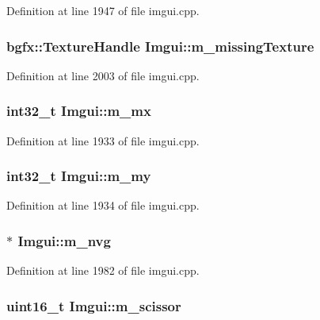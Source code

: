 Definition at line 1947 of file imgui.\+cpp.

\hypertarget{struct_imgui_afbc6e41c677110223b6319da003596e5}{
\subsubsection[{m\+\_\+missing\+Texture}]{\setlength{\rightskip}{0pt plus 5cm}bgfx\+::\+Texture\+Handle Imgui\+::m\+\_\+missing\+Texture}}\label{struct_imgui_afbc6e41c677110223b6319da003596e5}


Definition at line 2003 of file imgui.\+cpp.

\hypertarget{struct_imgui_a28eeab8c2fdd36902be42935ca1b068f}{
\subsubsection[{m\+\_\+mx}]{\setlength{\rightskip}{0pt plus 5cm}int32\+\_\+t Imgui\+::m\+\_\+mx}}\label{struct_imgui_a28eeab8c2fdd36902be42935ca1b068f}


Definition at line 1933 of file imgui.\+cpp.

\hypertarget{struct_imgui_a54acd29561c96474b53bd8c3aa26d1c8}{
\subsubsection[{m\+\_\+my}]{\setlength{\rightskip}{0pt plus 5cm}int32\+\_\+t Imgui\+::m\+\_\+my}}\label{struct_imgui_a54acd29561c96474b53bd8c3aa26d1c8}


Definition at line 1934 of file imgui.\+cpp.

\hypertarget{struct_imgui_a9e19f6927feb38c0736babf2ef908e11}{
\subsubsection[{m\+\_\+nvg}]{$\ast$ Imgui\+::m\+\_\+nvg}}\label{struct_imgui_a9e19f6927feb38c0736babf2ef908e11}


Definition at line 1982 of file imgui.\+cpp.

\hypertarget{struct_imgui_a2dcf14acfafc445b001d77eb33c65730}{
\subsubsection[{m\+\_\+scissor}]{\setlength{\rightskip}{0pt plus 5cm}uint16\+\_\+t Imgui\+::m\+\_\+scissor}}\label{struct_imgui_a2dcf14acfafc445b001d77eb33c65730}


